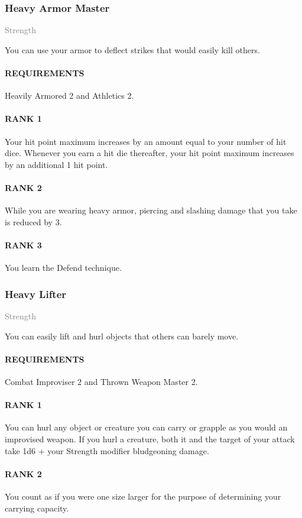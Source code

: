 \subsubsection{Heavy Armor Master} \label{feat::heavyarmormaster}
\small{\textcolor{gray}{Strength}}

\normalsize
You can use your armor to deflect strikes that would easily kill others.
\paragraph{REQUIREMENTS} Heavily Armored 2 and Athletics 2.
\paragraph{RANK 1} Your hit point maximum increases by an amount equal to your number of hit dice.
Whenever you earn a hit die thereafter, your hit point maximum increases by an additional 1 hit point.
\paragraph{RANK 2} While you are wearing heavy armor, piercing and slashing damage that you take is reduced by 3.
\paragraph{RANK 3} You learn the Defend technique.

\subsubsection{Heavy Lifter} \label{feat::heavylifter}
\small{\textcolor{gray}{Strength}}

\normalsize
You can easily lift and hurl objects that others can barely move.
\paragraph{REQUIREMENTS} Combat Improviser 2 and Thrown Weapon Master 2.
\paragraph{RANK 1} You can hurl any object or creature you can carry or grapple as you would an improvised weapon.
If you hurl a creature, both it and the target of your attack take 1d6 + your Strength modifier bludgeoning damage.
\paragraph{RANK 2} You count as if you were one size larger for the purpose of determining your carrying capacity.

